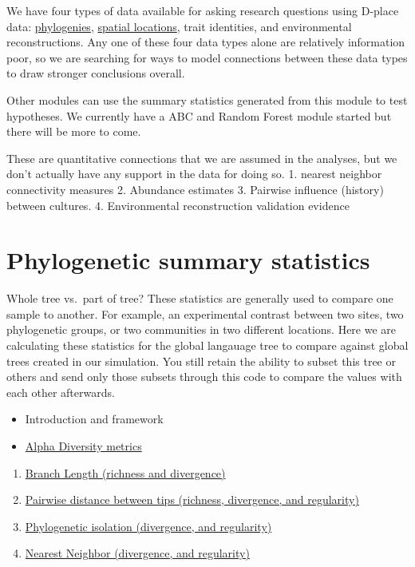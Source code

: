 \documentclass[]{book}
\providecommand{\tightlist}{%
  \setlength{\itemsep}{0pt}\setlength{\parskip}{0pt}}
\theoremstyle{definition}
\theoremstyle{definition}
\theoremstyle{definition}
\theoremstyle{remark}
\begin{document}
We have four types of data available for asking research questions using
D-place data:
\protect\hyperlink{phylogenetic-summary-statistics}{phylogenies},
\protect\hyperlink{spatial-locations}{spatial locations}, trait
identities, and environmental reconstructions. Any one of these four
data types alone are relatively information poor, so we are searching
for ways to model connections between these data types to draw stronger
conclusions overall.

Other modules can use the summary statistics generated from this module
to test hypotheses. We currently have a ABC and Random Forest module
started but there will be more to come.

These are quantitative connections that we are assumed in the analyses,
but we don't actually have any support in the data for doing so. 1.
nearest neighbor connectivity measures 2. Abundance estimates 3.
Pairwise influence (history) between cultures. 4. Environmental
reconstruction validation evidence

\hypertarget{phylogenetic-summary-statistics}{\section{Phylogenetic
summary statistics}\label{phylogenetic-summary-statistics}}

Whole tree vs.~part of tree? These statistics are generally used to
compare one sample to another. For example, an experimental contrast
between two sites, two phylogenetic groups, or two communities in two
different locations. Here we are calculating these statistics for the
global langauage tree to compare against global trees created in our
simulation. You still retain the ability to subset this tree or others
and send only those subsets through this code to compare the values with
each other afterwards.

\begin{itemize}
\tightlist
\item
  Introduction and framework
\item
  \protect\hyperlink{alpha-diversity-metrics}{Alpha Diversity metrics}
\end{itemize}

\begin{enumerate}
\def\labelenumi{\arabic{enumi}.}
\tightlist
\item
  \protect\hyperlink{branch-lengths}{Branch Length (richness and
  divergence)}
\item
  \protect\hyperlink{pairwise-distance-between-tips}{Pairwise distance
  between tips (richness, divergence, and regularity)}
\item
  \protect\hyperlink{phylogenetic-isolation}{Phylogenetic isolation
  (divergence, and regularity)}
\item
  \protect\hyperlink{nearest-phylogenetic-neighbor}{Nearest Neighbor
  (divergence, and regularity)}
\end{enumerate}
\end{document}
